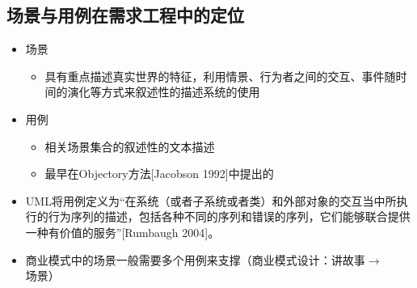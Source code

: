 \subsection{场景与用例在需求工程中的定位}
\begin{itemize}
    \item 场景
    \begin{itemize}
        \item 具有重点描述真实世界的特征，利用情景、行为者之间的交互、事件随时间的演化等方式来叙述性的描述系统的使用
    \end{itemize}
    \item 用例
    \begin{itemize}
        \item 相关场景集合的叙述性的文本描述 
        \item 最早在Objectory方法[Jacobson 1992]中提出的
    \end{itemize}
    \item UML将用例定义为“在系统（或者子系统或者类）和外部对象的交互当中所执行的行为序列的描述，包括各种不同的序列和错误的序列，它们能够联合提供一种有价值的服务”[Rumbaugh 2004]。
    \item 商业模式中的场景一般需要多个用例来支撑（商业模式设计：讲故事$\rightarrow$场景）
\end{itemize}


